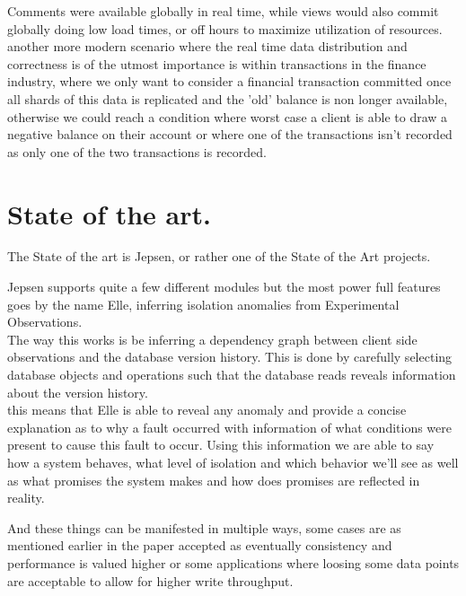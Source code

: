 \documentclass[a4paper,10pt,titlepage]{report}
\begin{document}
Comments were available globally in real time, while views would also commit globally doing low load times, or off hours to maximize utilization of resources.\\
\vspace{5mm}
another more modern scenario where the real time data distribution and correctness is of the utmost importance is within transactions in the finance industry,  where we only want to consider a financial transaction committed once all shards of this data is replicated and the 'old' balance is non longer available, otherwise we could reach a condition where worst case a client is able to draw a negative balance on their account or where one of the transactions isn't recorded as only one of the two transactions is recorded.\\


\section{State of the art.}

The State of the art is Jepsen, or rather one of the State of the Art projects.

Jepsen supports quite a few different modules but the most power full features goes by the name Elle, inferring isolation anomalies from Experimental Observations. \\
\vspace{5mm}
The way this works is be inferring a dependency graph between client side observations and the database version history. This is done by carefully selecting database objects and operations such that the database reads reveals information about the version history.\\
\vspace{5mm}
this means that Elle is able to reveal any anomaly and provide a concise explanation as to why a fault occurred with information of what conditions were present to cause this fault to occur. Using this information we are able to say how a system behaves, what level of isolation and which behavior we'll see as well as what promises the system makes and how does promises are reflected in reality.\\
\vspace{5mm}

And these things can be manifested in multiple ways, some cases are as mentioned earlier in the paper accepted as eventually consistency and performance is valued higher or some applications where loosing some data points are acceptable to allow for higher write throughput.\\
\vspace{5mm}
\end{document}
